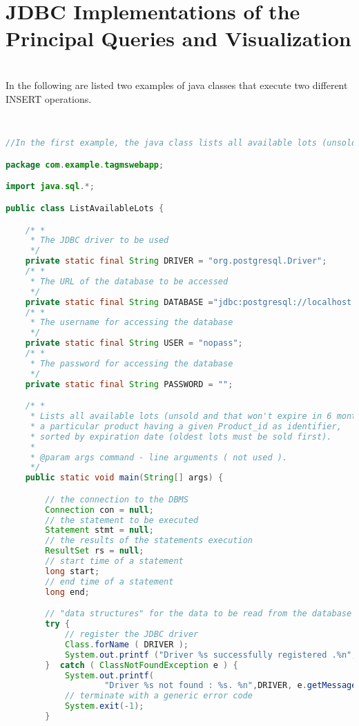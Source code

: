\section{JDBC Implementations of the Principal Queries and Visualization}
\\
In the following are listed two examples of java classes that execute two different INSERT operations.



\begin{lstlisting}[language=JAVA,
commentstyle = \color{gray},
keywordstyle = \color{blue}, 
stringstyle = \color{ForestGreen}, 
rulecolor = \color{black},
breaklines=true,
basicstyle=\ttfamily\footnotesize,
showstringspaces=false]


//In the first example, the java class lists all available lots (unsold and that won't expire in 6 months) containing a particular product having a given Product_id as identifier, sorted by expiration date (oldest lots must be sold first).

package com.example.tagmswebapp;

import java.sql.*;

public class ListAvailableLots {

    /* *
     * The JDBC driver to be used
     */
    private static final String DRIVER = "org.postgresql.Driver";
    /* *
     * The URL of the database to be accessed
     */
    private static final String DATABASE ="jdbc:postgresql://localhost:5432/tagmsdb";
    /* *
     * The username for accessing the database
     */
    private static final String USER = "nopass";
    /* *
     * The password for accessing the database
     */
    private static final String PASSWORD = "";

    /* *
     * Lists all available lots (unsold and that won't expire in 6 months) containing
     * a particular product having a given Product_id as identifier,
     * sorted by expiration date (oldest lots must be sold first).
     *
     * @param args command - line arguments ( not used ).
     */
    public static void main(String[] args) {

        // the connection to the DBMS
        Connection con = null;
        // the statement to be executed
        Statement stmt = null;
        // the results of the statements execution
        ResultSet rs = null;
        // start time of a statement
        long start;
        // end time of a statement
        long end;

        // "data structures" for the data to be read from the database
        try {
            // register the JDBC driver
            Class.forName ( DRIVER );
            System.out.printf ("Driver %s successfully registered .%n", DRIVER );
        }  catch ( ClassNotFoundException e ) {
            System.out.printf(
                    "Driver %s not found : %s. %n",DRIVER, e.getMessage());
            // terminate with a generic error code
            System.exit(-1);
        }


\end{lstlisting}

